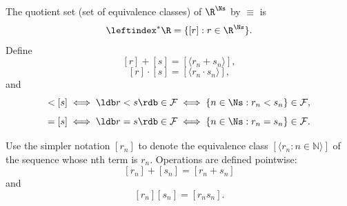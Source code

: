 \noin The quotient set (set of equivalence classes) of $\R^\Ns$ by $\equiv$ is 
$$
\leftindex^* {\R} = \{[r]:r\in \R^\Ns\}.
$$
Define
$$
[r]+[s] = [\langle r_n + s_n\rangle ],
$$
$$
[r]\cdot[s] = [\langle r_n \cdot s_n\rangle],
$$
and
\begin{equation}
    [r]<[s] \iff \ldb r<s \rdb \in \mathcal{F} \iff \{n \in \Ns : r_n < s_n \} \in \mathcal{F},
    \label{eq:2}
\end{equation}
\begin{equation*}
    [r]=[s] \iff \ldb r=s \rdb \in \mathcal{F} \iff \{n \in \Ns : r_n = s_n \} \in \mathcal{F}.
\end{equation*}

Use the simpler notation $[r_n]$ to denote the equivalence class $[\langle r_n : n \in \mathbb{N} \rangle]$ of the sequence whose nth term is $r_n$. Operations are defined pointwise: 
$$
[r_n]+[s_n]=[r_n+s_n]
$$ 
and 
$$
[r_n][s_n]=[r_n s_n].
$$

